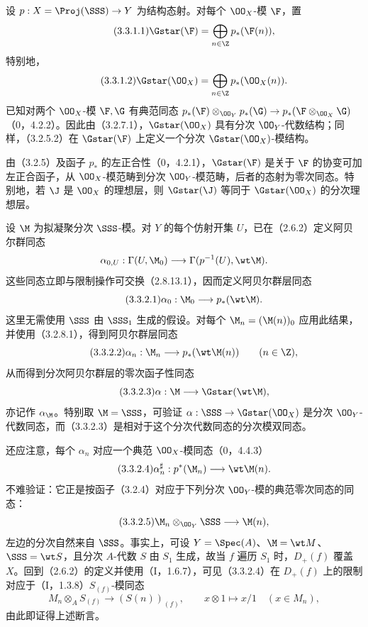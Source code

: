 设 $p:X=\Proj(\SSS)\to Y$ 为结构态射。对每个 $\OO_X$-模 $\F$，置
\begin{equation}\tag{3.3.1.1}\Gstar(\F)=\bigoplus_{n\in\Z}p_*(\F(n)),\end{equation}
特别地，
\begin{equation}\tag{3.3.1.2}\Gstar(\OO_X)=\bigoplus_{n\in\Z}p_*(\OO_X(n)).\end{equation}
已知对两个 $\OO_X$-模 $\F,\G$ 有典范同态
$p_*(\F)\otimes_{\OO_Y}p_*(\G)\to p_*(\F\otimes_{\OO_X}\G)$（0，4.2.2）。因此由（3.2.7.1），$\Gstar(\OO_X)$ 具有分次 $\OO_Y$-代数结构；同样，（3.2.5.2）在 $\Gstar(\F)$ 上定义一个分次 $\Gstar(\OO_X)$-模结构。

由（3.2.5）及函子 $p_*$ 的左正合性（0，4.2.1），$\Gstar(\F)$ 是关于 $\F$ 的协变可加左正合函子，从 $\OO_X$-模范畴到分次 $\OO_Y$-模范畴，后者的态射为零次同态。特别地，若 $\J$ 是 $\OO_X$ 的理想层，则 $\Gstar(\J)$ 等同于 $\Gstar(\OO_X)$ 的分次理想层。

设 $\M$ 为拟凝聚分次 $\SSS$-模。对 $Y$ 的每个仿射开集 $U$，已在（2.6.2）定义阿贝尔群同态
\[
\alpha_{0,U}:\Gamma(U,\M_0)\longrightarrow\Gamma(p^{-1}(U),\wt\M).
\]
这些同态立即与限制操作可交换（2.8.13.1），因而定义阿贝尔群层同态
\begin{equation}\tag{3.3.2.1}\alpha_0:\M_0\longrightarrow p_*(\wt\M).\end{equation}
这里无需使用 $\SSS$ 由 $\SSS_1$ 生成的假设。对每个 $\M_n=(\M(n))_0$ 应用此结果，并使用（3.2.8.1），得到阿贝尔群层同态
\begin{equation}\tag{3.3.2.2}\alpha_n:\M_n\longrightarrow p_*(\wt\M(n))\qquad(n\in\Z),\end{equation}
从而得到分次阿贝尔群层的零次函子性同态
\begin{equation}\tag{3.3.2.3}\alpha:\M\longrightarrow\Gstar(\wt\M),\end{equation}
亦记作 $\alpha_{\M}$。特别取 $\M=\SSS$，可验证 $\alpha:\SSS\to\Gstar(\OO_X)$ 是分次 $\OO_Y$-代数同态，而（3.3.2.3）是相对于这个分次代数同态的分次模双同态。

还应注意，每个 $\alpha_n$ 对应一个典范 $\OO_X$-模同态（0，4.4.3）
\begin{equation}\tag{3.3.2.4}\alpha_n^\sharp:p^*(\M_n)\longrightarrow\wt\M(n).\end{equation}
不难验证：它正是按函子（3.2.4）对应于下列分次 $\OO_Y$-模的典范零次同态的同态：
\begin{equation}\tag{3.3.2.5}\M_n\otimes_{\OO_Y}\SSS\longrightarrow\M(n),\end{equation}
左边的分次自然来自 $\SSS$。事实上，可设 $Y=\Spec(A)$、$\M=\wt M$、$\SSS=\wt S$，且分次 $A$-代数 $S$ 由 $S_1$ 生成，故当 $f$ 遍历 $S_1$ 时，$D_+(f)$ 覆盖 $X$。回到（2.6.2）的定义并使用（I，1.6.7），可见（3.3.2.4）在 $D_+(f)$ 上的限制对应于（I，1.3.8）$S_{(f)}$-模同态
\[
M_n\otimes_A S_{(f)}\longrightarrow(S(n))_{(f)},\qquad x\otimes1\longmapsto x/1\quad(x\in M_n),
\]
由此即证得上述断言。

